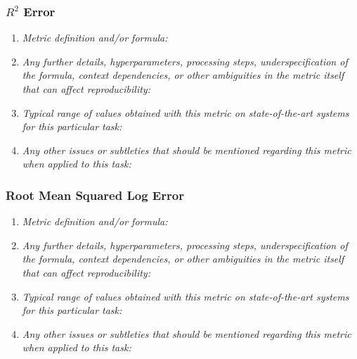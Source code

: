 \documentclass[a4paper,11pt]{article}
\begin{document}
        \subsubsection{$R^2$ Error}
            \begin{enumerate}[label=\alph*.]
                \item \textit{Metric definition and/or formula:}
                \bigskip
                \item \textit{Any further details, hyperparameters, processing steps, underspecification of the formula, context dependencies, or other ambiguities in the metric itself that can affect reproducibility:}
                \bigskip
                \item \textit{Typical range of values obtained with this metric on state-of-the-art systems for this particular task:}
                \bigskip
                \item \textit{Any other issues or subtleties that should be mentioned regarding this metric when applied to this task:}
                \bigskip
            \end{enumerate}
        \subsubsection{Root Mean Squared Log Error}
            \begin{enumerate}[label=\alph*.]
                \item \textit{Metric definition and/or formula:}
                \bigskip
                \item \textit{Any further details, hyperparameters, processing steps, underspecification of the formula, context dependencies, or other ambiguities in the metric itself that can affect reproducibility:}
                \bigskip
                \item \textit{Typical range of values obtained with this metric on state-of-the-art systems for this particular task:}
                \bigskip
                \item \textit{Any other issues or subtleties that should be mentioned regarding this metric when applied to this task:}
                \bigskip
            \end{enumerate}
\end{document}
